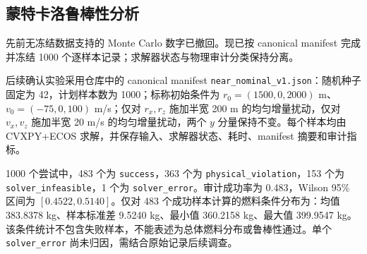 \subsection{蒙特卡洛鲁棒性分析}

先前无冻结数据支持的 Monte Carlo 数字已撤回。现已按 canonical manifest 完成并冻结 1000 个逐样本记录；求解器状态与物理审计分类保持分离。

后续确认实验采用仓库中的 canonical manifest \texttt{near\_nominal\_v1.json}：随机种子固定为 42，计划样本数为 1000；标称初始条件为 $r_0=(1500,0,2000)$ m、$v_0=(-75,0,100)$ m/s；仅对 $r_x,r_z$ 施加半宽 200 m 的均匀增量扰动，仅对 $v_x,v_z$ 施加半宽 20 m/s 的均匀增量扰动，两个 $y$ 分量保持不变。每个样本均由 CVXPY+ECOS 求解，并保存输入、求解器状态、耗时、manifest 摘要和审计指标。

1000 个尝试中，483 个为 \texttt{success}，363 个为 \texttt{physical\_\allowbreak violation}，153 个为 \texttt{solver\_\allowbreak infeasible}，1 个为 \texttt{solver\_error}。审计成功率为 0.483，Wilson 95\% 区间为 $[0.4522,0.5140]$。仅对 483 个成功样本计算的燃料条件分布为：均值 383.8378 kg、样本标准差 9.5240 kg、最小值 360.2158 kg、最大值 399.9547 kg。该条件统计不包含失败样本，不能表述为总体燃料分布或鲁棒性通过。单个 \texttt{solver\_error} 尚未归因，需结合原始记录后续调查。
